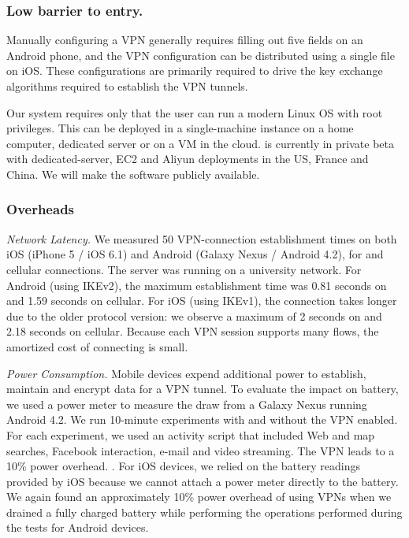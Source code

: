 \subsubsection{Low barrier to entry.} 
Manually configuring a VPN generally requires filling out five fields on an Android phone, and the VPN configuration can be distributed using a single file on iOS. 
These configurations are primarily required to drive the key exchange algorithms required to establish the VPN tunnels.

Our \meddlebox system requires only that the user can run a modern Linux OS with root privileges. This can be deployed 
in a single-machine instance on a home computer, dedicated server or on a VM in the cloud. \meddle is currently in private beta with dedicated-server, EC2 and Aliyun deployments in the US, France and China. We will make the \meddle software publicly available.

\subsubsection{Overheads} 
\noindent\emph{Network Latency.}
We measured 50 VPN-connection establishment times  on both iOS (iPhone 5 / iOS 6.1) and Android (Galaxy Nexus /
Android 4.2), for \wifi{} and cellular connections. 
The \meddle server was running on a university network. 
For Android (using IKEv2), the maximum establishment time was 0.81 seconds on \wifi{} and 1.59 seconds on cellular. 
For iOS (using IKEv1), the connection takes longer due to the older protocol version: we observe a maximum of 2 seconds on \wifi{} and 2.18 seconds on cellular. 
Because each VPN session supports many flows, the amortized cost of connecting is  small. 

\noindent\emph{Power Consumption.}
Mobile devices expend additional power to establish, maintain and encrypt data for a VPN tunnel. 
To evaluate the impact on battery, we used a power meter to measure the draw from a Galaxy Nexus running Android 4.2. 
We run 10-minute experiments with and without the VPN enabled. 
For each experiment, we used an activity script that included Web and map searches, Facebook interaction, e-mail and video
streaming. 
The VPN leads to a 10\% power overhead. . 
For iOS devices, we relied on the battery readings provided by iOS because we cannot attach a power meter directly to the battery.
We again found an approximately 10\% power overhead of using VPNs when we drained a fully charged battery while performing the operations performed during the tests for Android devices.  

